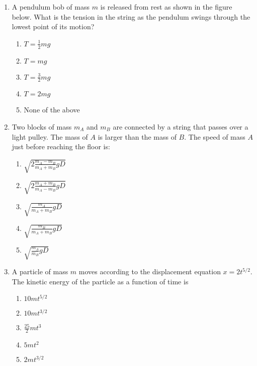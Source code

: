 \documentclass{../../oss-apphys}
\begin{document}
\begin{multicols}{2}
\begin{enumerate}[resume,leftmargin=18pt]
  \item A pendulum bob of mass $m$ is released from rest as shown in the figure
    below. What is the tension in the string as the pendulum swings through the
    lowest point of its motion?
    \begin{center}
    \end{center}
    \begin{enumerate}[noitemsep,topsep=0pt,leftmargin=18pt,label=(\Alph*)]
    \item $\displaystyle T=\frac{1}{2}mg$
    \item $T=mg$
    \item $\displaystyle T=\frac{3}{2}mg$
    \item $T=2mg$
    \item None of the above
    \end{enumerate}

  \item Two blocks of mass $m_A$ and $m_B$ are connected by a string that
    passes over a light pulley. The mass of $A$ is larger than the mass of $B$.
    The speed of mass $A$ just before reaching the floor is:
    \begin{center}
    \end{center}
    \begin{enumerate}[noitemsep,topsep=0pt,leftmargin=18pt,label=(\Alph*)]
    \item $\displaystyle\sqrt{2\frac{m_A-m_B}{m_A+m_B}gD}$
    \item $\displaystyle\sqrt{2\frac{m_A+m_B}{m_A-m_B}gD}$
    \item $\displaystyle\sqrt{\frac{m_A}{m_A+m_B}gD}$
    \item $\displaystyle\sqrt{\frac{m_B}{m_A+m_B}gD}$
    \item $\displaystyle\sqrt{\frac{m_A}{m_B}gD}$
    \end{enumerate}

  \item A particle of mass $m$ moves according to the displacement equation
    $x=2t^{5/2}$. The kinetic energy of the particle as a function of time is
    \begin{enumerate}[noitemsep,topsep=0pt,leftmargin=18pt,label=(\Alph*)]
    \item $10mt^{5/2}$
    \item $10mt^{3/2}$
    \item $\displaystyle\frac{25}{2}mt^3$
    \item $5mt^2$
    \item $2mt^{3/2}$
    \end{enumerate}


\end{enumerate}
\end{multicols}
\end{document}
